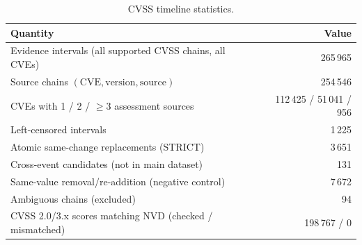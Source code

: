 \begin{table}\centering\small
\caption{CVSS timeline statistics.}\label{tab:zaman}
\begin{tabular*}{\textwidth}{@{\extracolsep{\fill}}lr@{}}\toprule
Quantity & Value \\\midrule
Evidence intervals (all supported CVSS chains, all CVEs) & 265\,965 \\
Source chains $(\text{CVE}, \text{version}, \text{source})$ & 254\,546 \\
CVEs with 1 / 2 / $\geq$3 assessment sources & 112\,425 / 51\,041 / 956 \\
Left-censored intervals & 1\,225 \\
Atomic same-change replacements (STRICT) & 3\,651 \\
Cross-event candidates (not in main dataset) & 131 \\
Same-value removal/re-addition (negative control) & 7\,672 \\
Ambiguous chains (excluded) & 94 \\
CVSS 2.0/3.x scores matching NVD (checked / mismatched) & 198\,767 / 0 \\
\bottomrule
\end{tabular*}
\end{table}
